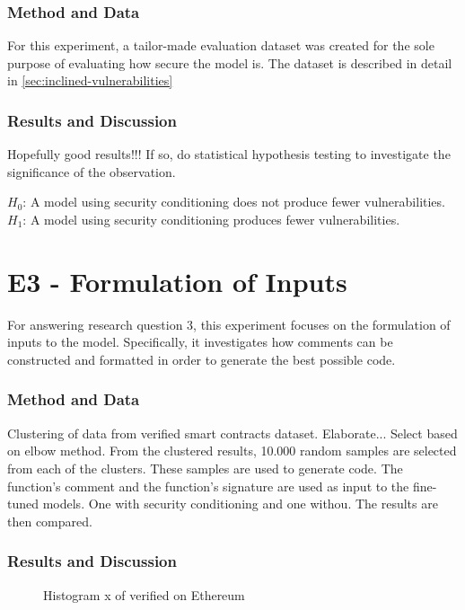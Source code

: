 \subsubsection{Method and Data}
For this experiment, a tailor-made evaluation dataset was created for the sole purpose of evaluating how secure the model is. The dataset is described in detail in \cref{sec:inclined-vulnerabilities}

\subsubsection{Results and Discussion}
Hopefully good results!!! If so, do statistical hypothesis testing to investigate the significance of the observation.

\textbf{\(H_0\)}: A model using security conditioning does not produce fewer vulnerabilities. 
\textbf{\(H_1\)}: A model using security conditioning produces fewer vulnerabilities.


\section{E3 - Formulation of Inputs}
\label{sec:e3-formulation-of-inputs}
For answering research question 3, this experiment focuses on the formulation of inputs to the model. Specifically, it investigates how comments can be constructed and formatted in order to generate the best possible code.

\subsubsection{Method and Data}
Clustering of data from verified smart contracts dataset. Elaborate... Select based on elbow method. From the clustered results, 10.000 random samples are selected from each of the clusters. These samples are used to generate code. The function's comment and the function's signature are used as input to the fine-tuned models. One with security conditioning and one withou. The results are then compared.

\subsubsection{Results and Discussion}


\begin{figure}[ht]
    \centering
    
    \caption{Histogram \small x of verified  on Ethereum}
\end{figure}



